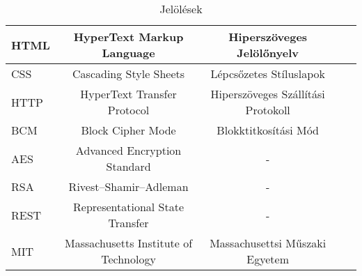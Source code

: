\begin{table}[h!]
\begin{tabular}{ | l | c | c | c | c |}
		\hline
		HTML & HyperText Markup Language & Hiperszöveges Jelölőnyelv \\
		\hline
		CSS & Cascading Style Sheets & Lépcsőzetes Stíluslapok \\
		\hline
		HTTP & HyperText Transfer Protocol & Hiperszöveges Szállítási Protokoll \\
		\hline
		BCM & Block Cipher Mode & Blokktitkosítási Mód \\
		\hline
		AES & Advanced Encryption Standard & - \\
		\hline
		RSA & Rivest–Shamir–Adleman & - \\
		\hline
		REST & Representational State Transfer & - \\
		\hline
		MIT & Massachusetts Institute of Technology & Massachusettsi Műszaki Egyetem \\
		\hline
		\end{tabular}
		\caption{Jelölések}
		\label{tablazat1}
\end{table}